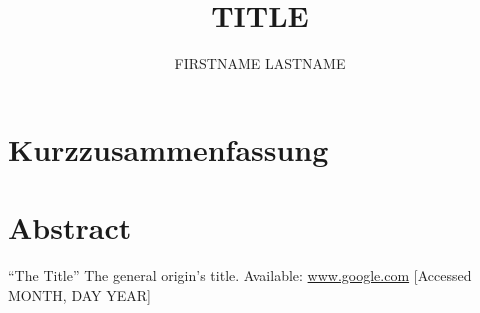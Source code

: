 \documentclass[
    paper = a4,
    fontsize = 12pt,
    headinclude = true,
    open = right,
    twoside = true,
    BCOR = 10mm,
    toc = listofnumbered,
    numbers = noendperiod,
    ]{report}
\title{TITLE}
\author{FIRSTNAME LASTNAME}
\date{\currenttime}
\begin{document}
        

        \section*{Kurzzusammenfassung}
        
        \section*{Abstract}
        

        \clearpage

        \tableofcontents
        \clearpage

        

        

        

        

        
        \clearpage
        \printglossaries
        \printglossary[type=\acronymtype,title=Abkürzungsverzeichnis,toctitle=Abkürzungsverzeichnis]

        \printglossary[title=Glossar,toctitle=Glossar]
        \clearpage

    \begin{thebibliography}{9}

     ``The Title'' The general origin's title. Available: \url{www.google.com} [Accessed MONTH, DAY YEAR]

    \end{thebibliography}
\end{document}
